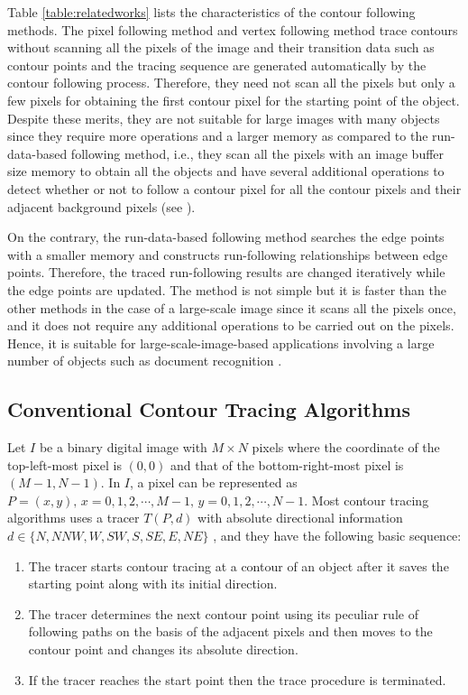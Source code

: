 Table \ref{table:relatedworks} lists the characteristics of the contour following methods. The pixel following method and vertex following method trace contours without scanning all the pixels of the image and their transition data such as contour points and the tracing sequence are generated automatically by the contour following process. Therefore, they need not scan all the pixels but only a few pixels for obtaining the first contour pixel for the starting point of the object. Despite these merits, they are not suitable for large images with many objects since they require more operations and a larger memory as compared to the run-data-based following method, i.e., they scan all the pixels with an image buffer size memory to obtain all the objects and have several additional operations to detect whether or not to follow a contour pixel for all the contour pixels and their adjacent background pixels (see ). 

On the contrary, the run-data-based following method searches the edge points with a smaller memory and constructs run-following relationships between edge points. Therefore, the traced run-following results are changed iteratively while the edge points are updated. The method is not simple but it is faster than the other methods in the case of a large-scale image since it scans all the pixels once, and it does not require any additional operations to be carried out on the pixels. Hence, it is suitable for large-scale-image-based applications involving a large number of objects such as document recognition \cite{Miyatake1997Contour}.

\subsection{Conventional Contour Tracing Algorithms}

Let $I$ be a binary digital image with $M \times N$ pixels where the coordinate of the top-left-most pixel is $(0, 0)$ and that of the bottom-right-most pixel is $(M-1, N-1)$. In $I$, a pixel can be represented as $P = (x, y),\, x = 0,1,2,\cdots,M-1,\, y = 0,1,2,\cdots, N-1$. Most contour tracing algorithms uses a tracer $T (P, d)$ with absolute directional information $d\in\{N,NNW,W,SW,S,SE,E,NE\}$ , and they have the following basic sequence: 
\begin{enumerate}
\item The tracer starts contour tracing at a contour of an object after it saves the starting point along with its initial direction. 
\item The tracer determines the next contour point using its peculiar rule of following paths on the basis of the adjacent pixels and then moves to the contour point and changes its absolute direction. 
\item If the tracer reaches the start point then the trace procedure is terminated. 
\end{enumerate}

